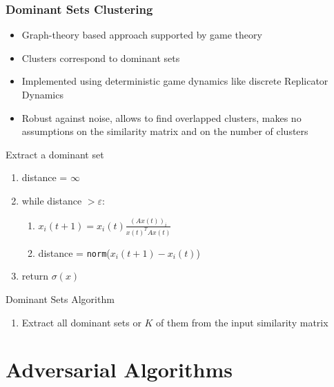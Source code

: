 \documentclass{beamer}
\begin{document}
\begin{frame}
	\frametitle{Dominant Sets Clustering}
	\begin{itemize}
	\item Graph-theory based approach supported by game theory
	\item Clusters correspond to dominant sets
	\item Implemented using deterministic game dynamics like discrete Replicator Dynamics
	\item Robust against noise, allows to find overlapped clusters, makes no assumptions on the similarity matrix and on the number of clusters
\end{itemize}
	\begin{block}{Extract a dominant set}
	\begin{footnotesize}
	\begin{enumerate}
		\item distance = $\infty$
		\item while distance $> \varepsilon$:
		\begin{enumerate}
			\item $x_i(t+1) = x_i(t)\frac{(Ax(t))_i}{x(t)^TAx(t)}$
			\item distance = \texttt{norm}($x_i(t+1) - x_i(t)$)
		\end{enumerate}
		\item return $\sigma(x)$
	\end{enumerate}
	\end{footnotesize}
\end{block}

	\begin{block}{Dominant Sets Algorithm}
	\begin{footnotesize}
	\begin{enumerate}
		\item Extract all dominant sets or $K$ of them from the input similarity matrix
	\end{enumerate}
	\end{footnotesize}
	\end{block}
\end{frame}

\section{Adversarial Algorithms}
\end{document}
